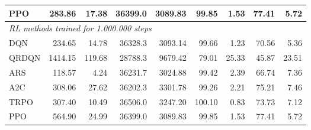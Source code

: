 \begin{samepage}
\begin{center}
\begin{tabular}{l|rr|rr|rr|rr}
    PPO          &   283.86 &    17.38 &    36399.0 &    3089.83 &   99.85 &    1.53 &   77.41 &    5.72 \\
    \midrule
    \multicolumn{9}{l}{\textit{RL methods trained for 1.000.000 steps}} \\
    \midrule
    DQN          &   234.65 &    14.78 &    36328.3 &    3093.14 &   99.66 &    1.23 &   70.56 &    5.36 \\
    QRDQN        &  1414.15 &   119.68 &    28788.3 &    9679.42 &   79.01 &   25.33 &   45.87 &   23.51 \\
    ARS          &   118.57 &     4.24 &    36231.7 &    3024.88 &   99.42 &    2.39 &   66.74 &    7.36 \\
    A2C          &   308.06 &    27.62 &    36202.3 &    3301.78 &   99.26 &    2.21 &   75.21 &    7.46 \\
    TRPO         &   307.40 &    10.49 &    36506.0 &    3247.20 &  100.10 &    0.83 &   73.73 &    7.12 \\
    PPO          &   564.90 &    24.99 &    36399.0 &    3089.83 &   99.85 &    1.53 &   77.41 &    5.72 \\
    \bottomrule
  \end{tabular}
\end{center}
\end{samepage}

